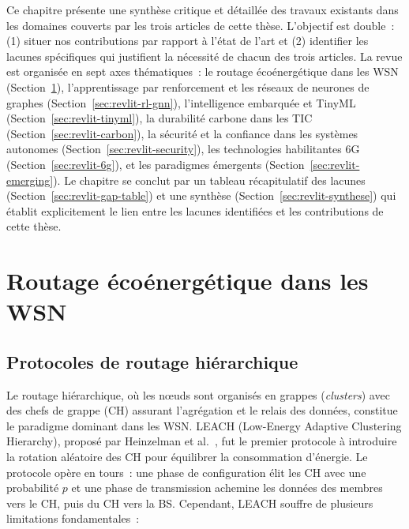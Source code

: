 \label{sec:RevLitt}

Ce chapitre présente une synthèse critique et détaillée des travaux existants dans les domaines couverts par les trois articles de cette thèse. L'objectif est double~: (1) situer nos contributions par rapport à l'état de l'art et (2) identifier les lacunes spécifiques qui justifient la nécessité de chacun des trois articles. La revue est organisée en sept axes thématiques~: le routage écoénergétique dans les WSN (Section~\ref{sec:revlit-routing}), l'apprentissage par renforcement et les réseaux de neurones de graphes (Section~\ref{sec:revlit-rl-gnn}), l'intelligence embarquée et TinyML (Section~\ref{sec:revlit-tinyml}), la durabilité carbone dans les TIC (Section~\ref{sec:revlit-carbon}), la sécurité et la confiance dans les systèmes autonomes (Section~\ref{sec:revlit-security}), les technologies habilitantes 6G (Section~\ref{sec:revlit-6g}), et les paradigmes émergents (Section~\ref{sec:revlit-emerging}). Le chapitre se conclut par un tableau récapitulatif des lacunes (Section~\ref{sec:revlit-gap-table}) et une synthèse (Section~\ref{sec:revlit-synthese}) qui établit explicitement le lien entre les lacunes identifiées et les contributions de cette thèse.

\section{Routage écoénergétique dans les WSN}\label{sec:revlit-routing}

\subsection{Protocoles de routage hiérarchique}

Le routage hiérarchique, où les n\oe{}uds sont organisés en grappes (\emph{clusters}) avec des chefs de grappe (CH) assurant l'agrégation et le relais des données, constitue le paradigme dominant dans les WSN. LEACH (Low-Energy Adaptive Clustering Hierarchy), proposé par Heinzelman et al.\ \cite{heinzelman2000leach,heinzelman2002leach}, fut le premier protocole à introduire la rotation aléatoire des CH pour équilibrer la consommation d'énergie. Le protocole opère en tours~: une phase de configuration élit les CH avec une probabilité $p$ et une phase de transmission achemine les données des membres vers le CH, puis du CH vers la BS. Cependant, LEACH souffre de plusieurs limitations fondamentales~:

